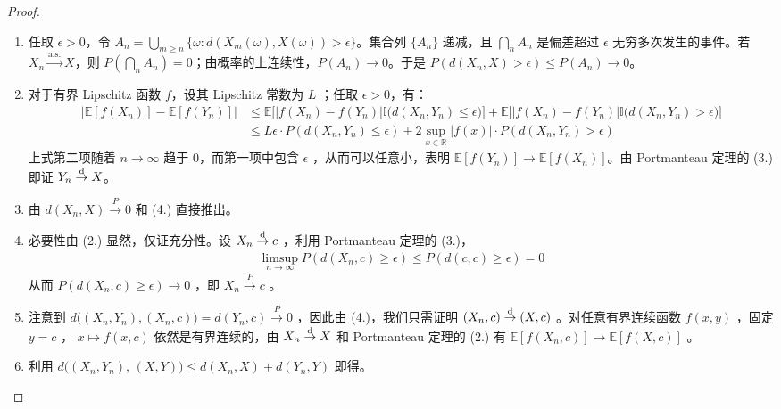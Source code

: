 \begin{proof}

\begin{enumerate}
  \item[(1.)] 任取 $\epsilon>0$，令 $A_n=\bigcup_{m\ge n}\{\omega:d(X_m(\omega),X(\omega))>\epsilon\}$。集合列 $\{A_n\}$ 递减，且 $\bigcap_nA_n$ 是偏差超过 $\epsilon$ 无穷多次发生的事件。若 $X_n\overset{\mathrm{a.s.}}\to X$，则 $P(\bigcap_nA_n)=0$；由概率的上连续性，$P(A_n)\to0$。于是 $P(d(X_n,X)>\epsilon)\le P(A_n)\to0$。
  \item[(4.)] 对于有界 Lipschitz 函数 $f$，设其 Lipschitz 常数为 $L$ ；任取 $\epsilon > 0$，有：
\[\begin{aligned}  |\mathbb{E} [f(X_n)] - \mathbb{E} [f(Y_n)]|     &\le \mathbb{E}\Big[\big|f(X_n) - f(Y_n)\big| \mathbb{I}\big(d(X_n, Y_n)\le \epsilon\big)\Big] + \mathbb{E}\Big[\big|f(X_n) - f(Y_n)\big| \mathbb{I}\big(d(X_n, Y_n) > \epsilon\big)\Big] \\ &\le L\epsilon \cdot P(d(X_n, Y_n) \le \epsilon) + 2 \sup_{x\in\mathbb R} |f(x)|\cdot P(d(X_n, Y_n) > \epsilon)    \end{aligned}\]
上式第二项随着 $n\to\infty$ 趋于 0，而第一项中包含 $\epsilon$ ，从而可以任意小，表明 $\mathbb E [f(Y_n)] \to \mathbb E [f(X_n)]$。由 Portmanteau 定理的 (3.) 即证 $Y_n\overset{\rm d}\to X$。

  \item[(2.)] 由 $d(X_n,X)\overset P\to 0$ 和 (4.) 直接推出。
  \item[(3.)] 必要性由 (2.) 显然，仅证充分性。设 $X_n\overset{\rm d}\to c$ ，利用 Portmanteau 定理的 (3.)，
\[\begin{aligned} \limsup_{n\to\infty} P(d(X_n,c)\ge\epsilon) \le P(d(c,c)\ge \epsilon)=0 \end{aligned}\]
从而 $P(d(X_n,c)\ge\epsilon)\to 0$ ，即 $X_n\overset P\to c$ 。
  \item[(5.)] 注意到 $d\big((X_n,Y_n),(X_n,c)\big)=d(Y_n,c)\overset P\to 0$ ，因此由 (4.)，我们只需证明 $(X_n,c)\overset{\rm d}\to (X,c)$ 。对任意有界连续函数 $f(x,y)$ ，固定 $y=c$ ， $x\mapsto f(x,c)$ 依然是有界连续的，由 $X_n\overset{\rm d}\to X$ 和 Portmanteau 定理的 (2.) 有 $\mathbb{E}[f(X_n,c)]\to \mathbb{E}[f(X,c)]$ 。
  \item[(6.)] 利用 $d\big((X_n,Y_n),\, (X,Y)\big) \le d(X_n,X) + d(Y_n,Y)$ 即得。

\end{enumerate}


\end{proof}

